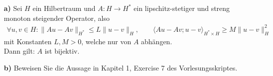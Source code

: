 
\begin{exercise}
\phantom{}
\begin{itemize}
  \item[\textbf{a)}] Sei $H$ ein Hilbertraum und $A: H \to H^*$ ein lipschitz-stetiger
  und streng monoton steigender Operator, also
  \begin{align*}
    \forall u,v \in H: \|Au - Av\|_{H^*} \leq L\|u - v\|_H,
    \qquad \langle Au - Av; u - v \rangle_{H^*\times H}
    \geq M\|u -v\|_H^2
  \end{align*}
  mit Konstanten $L, M > 0$, welche nur von $A$ abhängen. \\
  Dann gilt: $A$ ist bijektiv.
  \item[\textbf{b)}] Beweisen Sie die Aussage in Kapitel 1, Exercise 7 des Vorlesungsskriptes.
\end{itemize}

\end{exercise}


